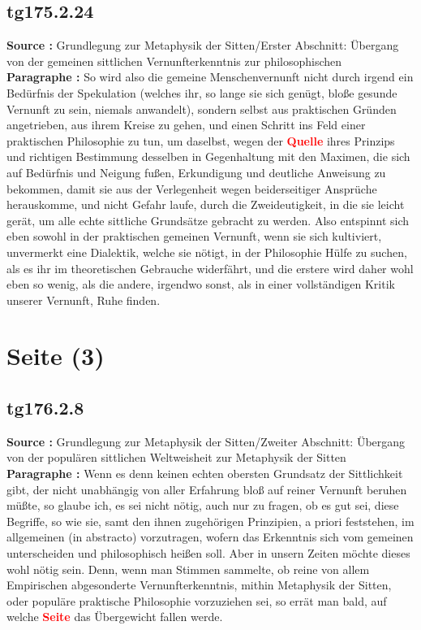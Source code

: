 \documentclass[a4paper,12pt,twoside]{book}
\newcommand{\match}[1]{\textcolor{red}{\textbf{#1}}}
\newcommand{\unnumberedsection}[1]{
	\section*{#1}
	\addcontentsline{toc}{section}{#1}
	\markright{#1}
}
\begin{document}
	\subsection*{tg175.2.24} 
	\textbf{Source : }Grundlegung zur Metaphysik der Sitten/Erster Abschnitt: Übergang von der gemeinen sittlichen Vernunfterkenntnis zur philosophischen\\  
	
	\noindent\textbf{Paragraphe : }So wird also die gemeine Menschenvernunft nicht durch irgend ein Bedürfnis der Spekulation (welches ihr, so lange sie sich genügt, bloße gesunde Vernunft zu sein, niemals anwandelt), sondern selbst aus praktischen Gründen  angetrieben, aus ihrem Kreise zu gehen, und einen Schritt ins Feld einer praktischen Philosophie zu tun, um daselbst, wegen der \match{Quelle} ihres Prinzips und richtigen Bestimmung desselben in Gegenhaltung mit den Maximen, die sich auf Bedürfnis und Neigung fußen, Erkundigung und deutliche Anweisung zu bekommen, damit sie aus der Verlegenheit wegen beiderseitiger Ansprüche herauskomme, und nicht Gefahr laufe, durch die Zweideutigkeit, in die sie leicht gerät, um alle echte sittliche Grundsätze gebracht zu werden. Also entspinnt sich eben sowohl in der praktischen gemeinen Vernunft, wenn sie sich kultiviert, unvermerkt eine Dialektik, welche sie nötigt, in der Philosophie Hülfe zu suchen, als es ihr im theoretischen Gebrauche widerfährt, und die erstere wird daher wohl eben so wenig, als die andere, irgendwo sonst, als in einer vollständigen Kritik unserer Vernunft, Ruhe finden. 
	
	\unnumberedsection{Seite (3)} 
	\subsection*{tg176.2.8} 
	\textbf{Source : }Grundlegung zur Metaphysik der Sitten/Zweiter Abschnitt: Übergang von der populären sittlichen Weltweisheit zur Metaphysik der Sitten\\  
	
	\noindent\textbf{Paragraphe : }Wenn es denn keinen echten obersten Grundsatz der Sittlichkeit gibt, der nicht unabhängig von aller Erfahrung bloß auf reiner Vernunft beruhen müßte, so glaube ich, es sei nicht nötig, auch nur zu fragen, ob es gut sei, diese Begriffe, so wie sie, samt den ihnen zugehörigen Prinzipien, a priori feststehen, im allgemeinen (in abstracto) vorzutragen, wofern das Erkenntnis sich vom gemeinen unterscheiden und philosophisch heißen soll. Aber in unsern Zeiten möchte dieses wohl nötig sein. Denn, wenn man Stimmen sammelte, ob reine von allem Empirischen abgesonderte Vernunfterkenntnis, mithin Metaphysik der Sitten, oder populäre praktische Philosophie vorzuziehen sei, so errät man bald, auf welche \match{Seite} das Übergewicht fallen werde. 
	
\end{document}
